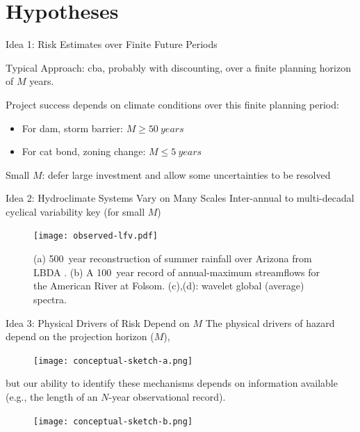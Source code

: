 \documentclass[
  10pt,     %
]{beamer}
\makeatletter
\newcommand*{\eg}{e.g.\@\xspace}
\makeatother
\begin{document}
\section{Hypotheses}

\begin{frame}{Idea 1: Risk Estimates over Finite Future Periods}
  \begin{alertblock}{Typical Approach:}
    \acrfull{cba}, probably with discounting, over a \alert{finite} planning horizon of $M$ years.
  \end{alertblock}
  \pause
  Project success depends on climate conditions over this finite planning period:
  \begin{itemize}
    \item For dam, storm barrier: $M \geq \SI{50}{years}$
    \item For cat bond, zoning change: $M \leq \SI{5}{years}$
  \end{itemize}
  \pause
  Small $M$: defer large investment and allow some uncertainties to be resolved
\end{frame}

\begin{frame}{Idea 2: Hydroclimate Systems Vary on Many Scales}
  Inter-annual to multi-decadal cyclical variability key (for small $M$)
  \begin{figure}
    \centering
    \texttt{[image: observed-lfv.pdf]}
    \caption{
      (a) \SI{500}{year} reconstruction of summer rainfall over Arizona from LBDA \citep{Cook:2010bz}.
      (b) A \SI{100}{year} record of annual-maximum streamflows for the American River at Folsom.
      (c),(d): wavelet global (average) spectra.
    }\label{fig:observed-lfv}
  \end{figure}
\end{frame}

\begin{frame}{Idea 3: Physical Drivers of Risk Depend on $M$}
  The physical drivers of hazard depend on the projection horizon ($M$),
  \begin{figure}
    \centering
    \texttt{[image: conceptual-sketch-a.png]}\\
  \end{figure}
  \pause
  but our ability to identify these mechanisms depends on information available (\eg, the length of an $N$-year observational record).
  \begin{figure}
    \centering
    \texttt{[image: conceptual-sketch-b.png]}
  \end{figure}
\end{frame}
\end{document}
